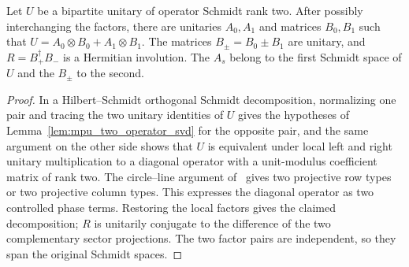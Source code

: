 \begin{lemma}
    \label{lem:mpu_two_schmidt_sectors}
    Let $U$ be a bipartite unitary of operator Schmidt rank two.
    After possibly interchanging the factors, there are unitaries
    $A_0,A_1$ and matrices $B_0,B_1$ such that
    $U=A_0\otimes B_0+A_1\otimes B_1$.
    The matrices $B_\pm=B_0\pm B_1$ are unitary, and
    $R=B_+^\dagger B_-$ is a Hermitian involution.
    The $A_s$ belong to the first Schmidt space of $U$ and the
    $B_\pm$ to the second.
\end{lemma}
\begin{proof}
    In a Hilbert--Schmidt orthogonal Schmidt decomposition, normalizing
    one pair and tracing the two unitary identities of
    $U$ gives the hypotheses of Lemma~\ref{lem:mpu_two_operator_svd}
    for the opposite pair, and the same argument on the other side shows that $U$ is
    equivalent under local left and right unitary multiplication to
    a diagonal operator with a unit-modulus coefficient matrix of rank two.
    The circle--line argument of~\cite[Lemma~3]{RankTwoMPUCircuits2026}
    gives two projective row types or two
    projective column types. This expresses the diagonal operator as
    two controlled phase terms. Restoring the local factors gives the
    claimed decomposition; $R$ is unitarily conjugate to the difference
    of the two complementary sector projections. The two factor pairs
    are independent, so they span the original Schmidt spaces.
\end{proof}

